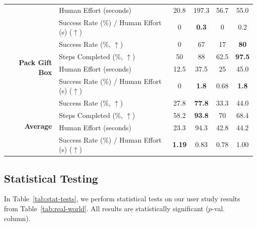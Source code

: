 \begin{table}[ht!]
{\begin{tabular}{rlcccc}
& Human Effort (seconds) & 20.8 & 197.3 & 56.7 & 55.0 \\
& Success Rate (\%) / Human Effort (s) ($\uparrow$) & 0 & \textbf{0.3} & 0 & 0.2 \\
\midrule
\multirow{4}{*}{\textbf{Pack Gift Box}} & Success Rate (\%, $\uparrow$) & 0 & 67 & 17 & \textbf{80} \\
& Steps Completed (\%, $\uparrow$) & 50 & 88 & 62.5 & \textbf{97.5} \\
& Human Effort (seconds) & 12.5 & 37.5 & 25 & 45.0 \\
& Success Rate (\%) / Human Effort (s) ($\uparrow$) & 0 & \textbf{1.8} & 0.68 & \textbf{1.8} \\
\midrule
\multirow{4}{*}{\textbf{Average}} & Success Rate (\%, $\uparrow$) & 27.8 & \textbf{77.8} & 33.3 & 44.0 \\
& Steps Completed (\%, $\uparrow$) & 58.2 & \textbf{93.8} & 70 & 68.4 \\
& Human Effort (seconds) & 23.3 & 94.3 & 42.8 & 44.2 \\
& Success Rate (\%) / Human Effort (s) ($\uparrow$) & \textbf{1.19} & 0.83 & 0.78 & 1.00 \\
\bottomrule
\end{tabular}
} %
\vspace{-1em}
\label{tab:new-results}
\end{table}

\subsection{Statistical Testing}
In Table~\ref{tab:stat-tests}, we perform statistical tests on our user study results from Table~\ref{tab:real-world}. All results are statistically significant ($p$-val. column).

